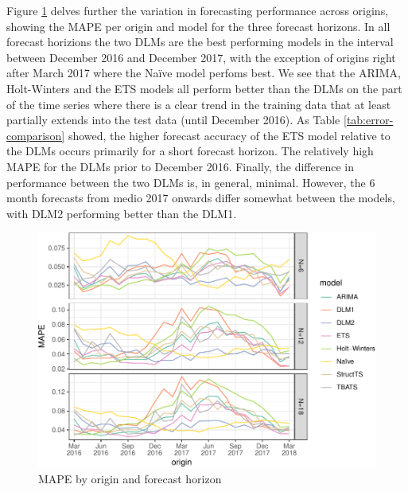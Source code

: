 \documentclass[]{article}
\begin{document}
Figure \ref{fig:rmse-origins} delves further the variation in
forecasting performance across origins, showing the MAPE per origin and
model for the three forecast horizons. In all forecast horizions the two
DLMs are the best performing models in the interval between December
2016 and December 2017, with the exception of origins right after March
2017 where the Naïve model perfoms best. We see that the ARIMA,
Holt-Winters and the ETS models all perform better than the DLMs on the
part of the time series where there is a clear trend in the training
data that at least partially extends into the test data (until December
2016). As Table \ref{tab:error-comparison} showed, the higher forecast
accuracy of the ETS model relative to the DLMs occurs primarily for a
short forecast horizon. The relatively high MAPE for the DLMs prior to
December 2016. Finally, the difference in performance between the two
DLMs is, in general, minimal. However, the 6 month forecasts from medio
2017 onwards differ somewhat between the models, with DLM2 performing
better than the DLM1.

\begin{figure}
\centering
\includegraphics{../figs/freq--rmse-origins-1.pdf}
\caption{\label{fig:rmse-origins}MAPE by origin and forecast horizon}
\end{figure}
\end{document}
